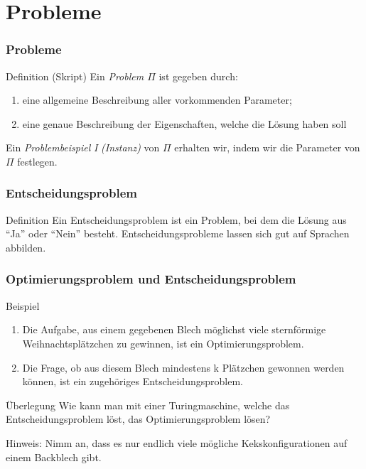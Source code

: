 \documentclass{beamer}
\begin{document}
{\section{Probleme}
\begin{frame}
 \frametitle{Probleme}
 \begin{block}{Definition (Skript)}
 Ein \emph{Problem $\Pi$} ist gegeben durch:
 \begin{enumerate}
  \item eine allgemeine Beschreibung aller vorkommenden Parameter;
  \item eine genaue Beschreibung der Eigenschaften, welche die Lösung haben soll
 \end{enumerate}
 \end{block}
 Ein \emph{Problembeispiel} \textit{I} \emph{(Instanz)} von $\Pi$ erhalten wir, indem wir die Parameter von $\Pi$ festlegen.
\end{frame}

\begin{frame}
 \frametitle{Entscheidungsproblem}
 \begin{block}{Definition}
  Ein Entscheidungsproblem ist ein Problem, bei dem die Lösung aus ``Ja'' oder ``Nein'' besteht. 
  Entscheidungsprobleme lassen sich gut auf Sprachen abbilden.
 \end{block}
\end{frame}

\begin{frame}
 \frametitle{Optimierungsproblem und Entscheidungsproblem}
 \begin{block}{Beispiel}
  \begin{enumerate}
   \item Die Aufgabe, aus einem gegebenen Blech möglichst viele sternförmige Weihnachtsplätzchen zu gewinnen, ist ein Optimierungsproblem.
   \item Die Frage, ob aus diesem Blech mindestens k Plätzchen gewonnen werden können, ist ein zugehöriges Entscheidungsproblem.
  \end{enumerate}
 \end{block}
 \begin{block}{Überlegung}
  Wie kann man mit einer Turingmaschine, welche das Entscheidungsproblem löst, das Optimierungsproblem lösen?
 \end{block}
 Hinweis: Nimm an, dass es nur endlich viele mögliche Kekskonfigurationen auf einem Backblech gibt.
\end{frame}

}
\end{document}

